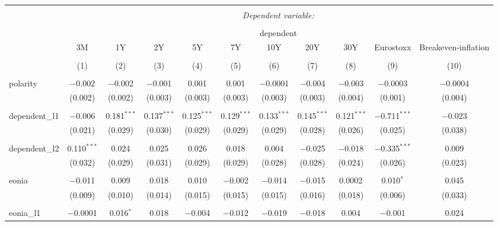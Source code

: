 \begin{table}[!htbp] \centering 
  \caption{} 
  \label{} 
\begin{tabular}{@{\extracolsep{5pt}}lcccccccccc} 
\\[-1.8ex]\hline 
\hline \\[-1.8ex] 
 & \multicolumn{10}{c}{\textit{Dependent variable:}} \\ 
\cline{2-11} 
\\[-1.8ex] & \multicolumn{10}{c}{dependent} \\ 
 & 3M & 1Y & 2Y & 5Y & 7Y & 10Y & 20Y & 30Y & Eurostoxx & Breakeven-inflation \\ 
\\[-1.8ex] & (1) & (2) & (3) & (4) & (5) & (6) & (7) & (8) & (9) & (10)\\ 
\hline \\[-1.8ex] 
 polarity & $-$0.002 & $-$0.002 & $-$0.001 & 0.001 & 0.001 & $-$0.0001 & $-$0.004 & $-$0.003 & $-$0.0003 & $-$0.0004 \\ 
  & (0.002) & (0.002) & (0.003) & (0.003) & (0.003) & (0.003) & (0.003) & (0.004) & (0.001) & (0.004) \\ 
  & & & & & & & & & & \\ 
 dependent\_l1 & $-$0.006 & 0.181$^{***}$ & 0.137$^{***}$ & 0.125$^{***}$ & 0.129$^{***}$ & 0.133$^{***}$ & 0.145$^{***}$ & 0.121$^{***}$ & $-$0.711$^{***}$ & $-$0.023 \\ 
  & (0.021) & (0.029) & (0.030) & (0.029) & (0.029) & (0.029) & (0.028) & (0.026) & (0.025) & (0.038) \\ 
  & & & & & & & & & & \\ 
 dependent\_l2 & 0.110$^{***}$ & 0.024 & 0.025 & 0.026 & 0.018 & 0.004 & $-$0.025 & $-$0.018 & $-$0.335$^{***}$ & 0.009 \\ 
  & (0.032) & (0.029) & (0.031) & (0.029) & (0.029) & (0.028) & (0.028) & (0.024) & (0.026) & (0.023) \\ 
  & & & & & & & & & & \\ 
 eonia & $-$0.011 & 0.009 & 0.018 & 0.010 & $-$0.002 & $-$0.014 & $-$0.015 & 0.0002 & 0.010$^{*}$ & 0.045 \\ 
  & (0.009) & (0.010) & (0.014) & (0.015) & (0.015) & (0.015) & (0.016) & (0.018) & (0.006) & (0.033) \\ 
  & & & & & & & & & & \\ 
 eonia\_l1 & $-$0.0001 & 0.016$^{*}$ & 0.018 & $-$0.004 & $-$0.012 & $-$0.019 & $-$0.018 & 0.004 & $-$0.001 & 0.024 \\ 

\end{tabular}
\end{table}
